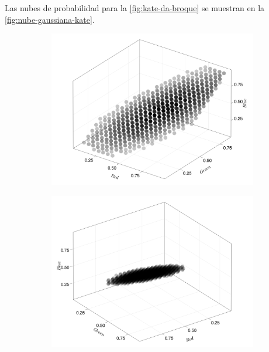 Las nubes de probabilidad para la \cref{fig:kate-da-broque} se muestran en la \cref{fig:nube-gaussiana-kate}.
\begin{figure}[ht!]
    \centering
    \begin{subfigure}[c]{0.3\textwidth}
        \centering
        \includegraphics[scale=0.09]{../pictures/gaussian_cloud_kate_1}
    \end{subfigure}
    \begin{subfigure}[c]{0.3\textwidth}
        \centering
        \includegraphics[scale=0.09]{../pictures/gaussian_cloud_kate_2}
    \end{subfigure}
    \begin{subfigure}[c]{0.3\textwidth}
        \centering

\end{subfigure}
\end{figure}
